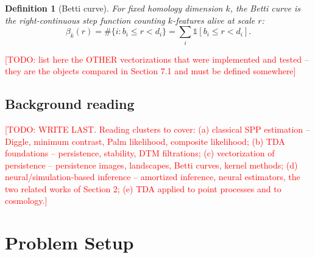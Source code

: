 \documentclass[11pt,letterpaper]{article}
\newcommand{\1}{\mathds{1}}
\newcommand{\todo}[1]{\textcolor{red}{[TODO: #1]}}
\newcommand{\todo}[1]{}
\theoremstyle{plain}
\theoremstyle{definitioncolon}
\newtheorem{definition}[theorem]{Definition}
\begin{document}
    \begin{definition}[Betti curve]
        For fixed homology dimension $k$, the Betti curve is the
        right-continuous step function counting $k$-features alive at scale $r$:
            \[
            \beta_k(r) = \#\{i : b_i \leq r < d_i\}
            = \sum_i \1[b_i \leq r < d_i].
            \]
    \end{definition}

\todo{list here the OTHER vectorizations that were implemented and tested --
they are the objects compared in Section 7.1 and must be defined somewhere}

\subsection{Background reading}
\todo{WRITE LAST. Reading clusters to cover:
 (a) classical SPP estimation -- Diggle, minimum contrast, Palm likelihood,
     composite likelihood;
 (b) TDA foundations -- persistence, stability, DTM filtrations;
 (c) vectorization of persistence -- persistence images, landscapes, Betti
     curves, kernel methods;
 (d) neural/simulation-based inference -- amortized inference, neural
     estimators, the two related works of Section 2;
 (e) TDA applied to point processes and to cosmology.}


\section{Problem Setup}
\label{sec:problem}
\end{document}
